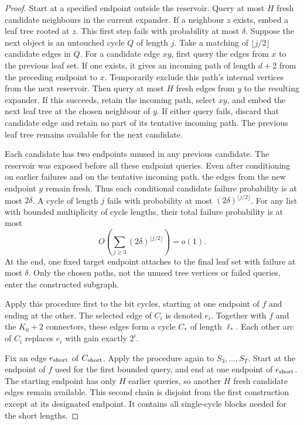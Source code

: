 \begin{proof}
Start at a specified endpoint outside the reservoir.
Query at most $H$ fresh candidate neighbours in the current expander.
If a neighbour $z$ exists, embed a leaf tree rooted at $z$.
This first step fails with probability at most $\delta$.
Suppose the next object is an untouched cycle $Q$ of length $j$.
Take a matching of $\lfloor j/2\rfloor$ candidate edges in $Q$.
For a candidate edge $xy$, first query the edges from $x$ to the previous leaf set.
If one exists, it gives an incoming path of length $d+2$ from the preceding endpoint to $x$.
Temporarily exclude this path's internal vertices from the next reservoir.
Then query at most $H$ fresh edges from $y$ to the resulting expander.
If this succeeds, retain the incoming path, select $xy$, and embed the next leaf tree at the chosen neighbour of $y$.
If either query fails, discard that candidate edge and retain no part of its tentative incoming path.
The previous leaf tree remains available for the next candidate.

Each candidate has two endpoints unused in any previous candidate.
The reservoir was exposed before all these endpoint queries.
Even after conditioning on earlier failures and on the tentative incoming path, the edges from the new endpoint $y$ remain fresh.
Thus each conditional candidate failure probability is at most $2\delta$.
A cycle of length $j$ fails with probability at most $(2\delta)^{\lfloor j/2\rfloor}$.
For any list with bounded multiplicity of cycle lengths, their total failure probability is at most
\[
 O\!\left(\sum_{j\ge3}(2\delta)^{\lfloor j/2\rfloor}\right)=o(1).
\]
At the end, one fixed target endpoint attaches to the final leaf set with failure at most $\delta$.
Only the chosen paths, not the unused tree vertices or failed queries, enter the constructed subgraph.

Apply this procedure first to the bit cycles, starting at one endpoint of $f$ and ending at the other.
The selected edge of $C_i$ is denoted $e_i$.
Together with $f$ and the $K_0+2$ connectors, these edges form a cycle $C_*$ of length $\ell_*$.
Each other arc of $C_i$ replaces $e_i$ with gain exactly $2^i$.

Fix an edge $e_{\rm short}$ of $C_{\rm short}$.
Apply the procedure again to $S_3,\ldots,S_T$.
Start at the endpoint of $f$ used for the first bounded query, and end at one endpoint of $e_{\rm short}$.
The starting endpoint has only $H$ earlier queries, so another $H$ fresh candidate edges remain available.
This second chain is disjoint from the first construction except at its designated endpoint.
It contains all single-cycle blocks needed for the short lengths.


\end{proof}

